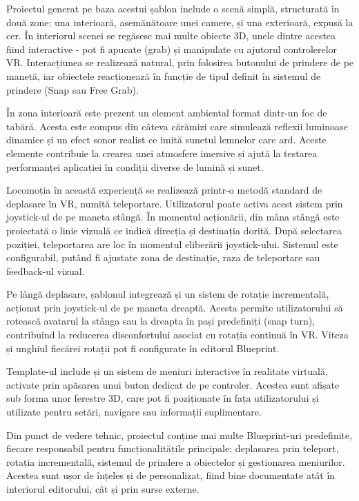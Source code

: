 Proiectul generat pe baza acestui șablon include o scenă simplă, structurată în două zone: una interioară, asemănătoare unei camere, și una exterioară, expusă la cer. În interiorul scenei se regăsesc mai multe obiecte 3D, unele dintre acestea fiind interactive - pot fi apucate (grab) și manipulate cu ajutorul controlerelor VR. Interacțiunea se realizează natural, prin folosirea butonului de prindere de pe manetă, iar obiectele reacționează în funcție de tipul definit în sistemul de prindere (Snap sau Free Grab).

În zona interioară este prezent un element ambiental format dintr-un foc de tabără. Acesta este compus din câteva cărămizi care simulează reflexii luminoase dinamice și un efect sonor realist ce imită sunetul lemnelor care ard. Aceste elemente contribuie la crearea unei atmosfere imersive și ajută la testarea performanței aplicației în condiții diverse de lumină și sunet.

Locomoția în această experiență se realizează printr-o metodă standard de deplasare în VR, numită teleportare. Utilizatorul poate activa acest sistem prin joystick-ul de pe maneta stângă. În momentul acționării, din mâna stângă este proiectată o linie vizuală ce indică direcția și destinația dorită. După selectarea poziției, teleportarea are loc în momentul eliberării joystick-ului. Sistemul este configurabil, putând fi ajustate zona de destinație, raza de teleportare sau feedback-ul vizual.

Pe lângă deplasare, șablonul integrează și un sistem de rotație incrementală, acționat prin joystick-ul de pe maneta dreaptă. Acesta permite utilizatorului să rotească avatarul la stânga sau la dreapta în pași predefiniți (snap turn), contribuind la reducerea disconfortului asociat cu rotația continuă în VR. Viteza și unghiul fiecărei rotații pot fi configurate în editorul Blueprint.

Template-ul include și un sistem de meniuri interactive în realitate virtuală, activate prin apăsarea unui buton dedicat de pe controler. Acestea sunt afișate sub forma unor ferestre 3D, care pot fi poziționate în fața utilizatorului și utilizate pentru setări, navigare sau informații suplimentare.

Din punct de vedere tehnic, proiectul conține mai multe Blueprint-uri predefinite, fiecare responsabil pentru funcționalitățile principale: deplasarea prin teleport, rotația incrementală, sistemul de prindere a obiectelor și gestionarea meniurilor. Acestea sunt ușor de înțeles și de personalizat, fiind bine documentate atât în interiorul editorului, cât și prin surse externe.

